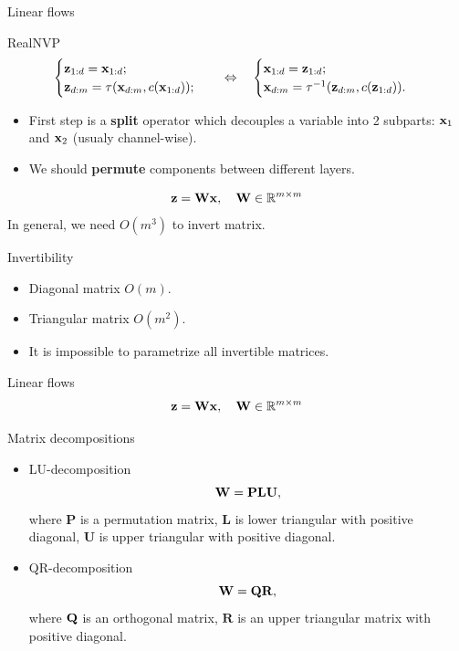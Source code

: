 \begin{frame}{Linear flows}
	
	\begin{block}{RealNVP}
		\vspace{-0.5cm}
		\begin{equation*}
			\begin{cases} \mathbf{z}_{1:d} = \mathbf{x}_{1:d}; \\ \mathbf{z}_{d:m} = \tau (\mathbf{x}_{d:m}, c(\mathbf{x}_{1:d}));\end{cases} 
			\quad \Leftrightarrow \quad 
			\begin{cases} \mathbf{x}_{1:d} = \mathbf{z}_{1:d}; \\ \mathbf{x}_{d:m} = \tau^{-1} (\mathbf{z}_{d:m}, c(\mathbf{z}_{1:d})).\end{cases}
		\end{equation*}
		\vspace{-0.2cm}
	\end{block}
	\begin{itemize}
	\item First step is a \textbf{split} operator which decouples a variable into 2 subparts: $\mathbf{x}_1$ and $\mathbf{x}_2$ (usualy channel-wise).
	\item We should \textbf{permute} components between different layers.
	\end{itemize}
	\[
		\mathbf{z} = \mathbf{W} \mathbf{x}, \quad \mathbf{W} \in \mathbb{R}^{m \times m}
	\]
	In general, we need $O(m^3)$ to invert matrix.
	\begin{block}{Invertibility}
		\begin{itemize}
			\item Diagonal matrix $O(m)$.
			\item Triangular matrix $O(m^2)$.
			\item It is impossible to parametrize all invertible matrices.
		\end{itemize}
	\end{block}
\end{frame}
\begin{frame}{Linear flows}
	\vspace{-0.3cm}
	\[
		\mathbf{z} = \mathbf{W} \mathbf{x}, \quad \mathbf{W} \in \mathbb{R}^{m \times m}
	\]
	\vspace{-0.3cm}
	\begin{block}{Matrix decompositions}
		\begin{itemize}
			\item LU-decomposition
			\[
				\mathbf{W} = \mathbf{P} \mathbf{L} \mathbf{U},
			\]
			where $\mathbf{P}$ is a permutation matrix, $\mathbf{L}$ is lower triangular with positive diagonal, $\mathbf{U}$ is upper triangular with positive diagonal.
			\item QR-decomposition
			\[
				\mathbf{W} = \mathbf{Q} \mathbf{R},
			\]
			where $\mathbf{Q}$ is an orthogonal matrix, $\mathbf{R}$ is an upper triangular matrix with positive diagonal.
		\end{itemize}
	\end{block}

\end{frame}
